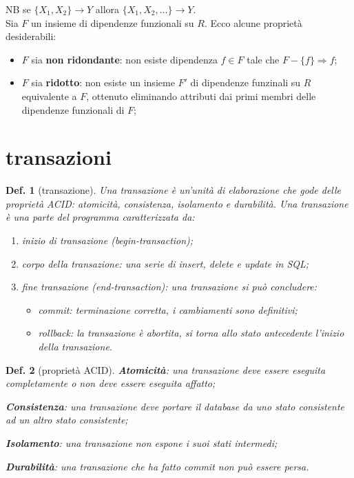 \documentclass{article}
\newtheorem{definition}{Def.}[section]
\begin{document}
NB se $\{X_1, X_2 \} \rightarrow Y$ allora $\{X_1, X_2, \dots \} \rightarrow
Y$.\\

Sia $F$ un insieme di dipendenze funzionali su $R$. Ecco alcune proprietà
desiderabili:
\begin{itemize}
	\item $F$ sia \textbf{non ridondante}: non esiste dipendenza $f
		\in F$ tale che $F - \{f\} \Rightarrow f$;

	\item $F$ sia \textbf{ridotto}: non esiste un insieme $F'$ di dipendenze
		funzinali su $R$ equivalente a $F$, ottenuto eliminando attributi dai
		primi membri delle dipendenze funzionali di $F$;
\end{itemize}

\section{transazioni}
\begin{definition}[transazione]
	Una transazione è un'unità di elaborazione che gode delle proprietà ACID:
	atomicità, consistenza, isolamento e durabilità.
	Una transazione è una parte del programma caratterizzata da:
	\begin{enumerate}
		\item inizio di transazione (begin-transaction);

		\item corpo della transazione: una serie di insert, delete e update in 
			SQL;

		\item fine transazione (end-transaction): una transazione si può 
			concludere:
			\begin{itemize}
				\item commit: terminazione corretta, i cambiamenti sono 
					definitivi;

				\item rollback: la transazione è abortita, si torna allo stato
					antecedente l'inizio della transazione.
			\end{itemize}
	\end{enumerate}
\end{definition}

\begin{definition}[proprietà ACID]

	\item \textbf{Atomicità}: una transazione deve essere eseguita completamente
		o non deve essere eseguita affatto;

	\item \textbf{Consistenza}: una transazione deve portare il database da uno 
		stato consistente ad un altro stato consistente;

	\item \textbf{Isolamento}: una transazione non espone i suoi stati 
		intermedi;

	\item \textbf{Durabilità}: una transazione che ha fatto commit non può 
		essere persa.
\end{definition}
\end{document}
